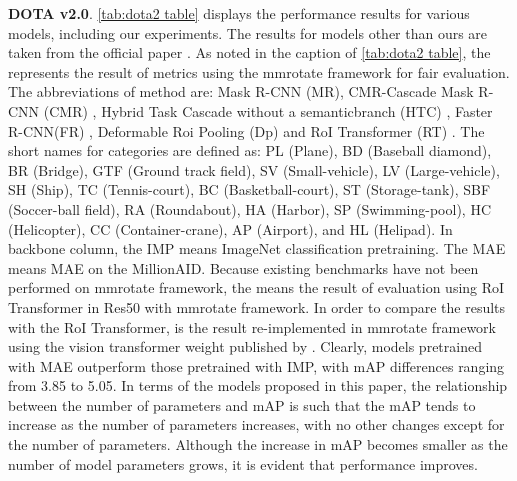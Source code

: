 \textbf{DOTA v2.0}. \autoref{tab:dota2 table} displays the performance results for various models, including our experiments. The results for models other than ours are taken from the official paper \cite{ding2021object}. As noted in the caption of \autoref{tab:dota2 table}, the  represents the result of metrics using the mmrotate framework for fair evaluation. {The abbreviations of method are: Mask R-CNN (MR)\cite{he2017mask}, CMR-Cascade Mask R-CNN (CMR) \cite{chen2019hybrid}, Hybrid Task Cascade without a semanticbranch (HTC) \cite{chen2019hybrid}, Faster R-CNN(FR) \cite{xia2018dota}, Deformable Roi Pooling (Dp) \cite{dai2017deformable} and RoI Transformer (RT) \cite{ding2019learning}. The short names for categories are defined as: PL (Plane), BD (Baseball diamond), BR (Bridge), GTF (Ground track field), SV (Small-vehicle), LV (Large-vehicle), SH (Ship), TC (Tennis-court), BC (Basketball-court), ST (Storage-tank), SBF (Soccer-ball field), RA (Roundabout), HA (Harbor), SP (Swimming-pool), HC (Helicopter), CC (Container-crane), AP (Airport), and HL (Helipad). In backbone column, the IMP means ImageNet classification pretraining. The MAE means MAE on the MillionAID.  Because existing benchmarks have not been performed on mmrotate framework, the  means the result of evaluation using RoI Transformer in Res50 with mmrotate framework. In order to compare the results with the RoI Transformer,  is the result re-implemented in mmrotate framework using the vision transformer weight published by \cite{wang2022advancing}.} Clearly, models pretrained with MAE outperform those pretrained with IMP, with mAP differences ranging from 3.85 to 5.05. In terms of the models proposed in this paper, the relationship between the number of parameters and mAP is such that the mAP tends to increase as the number of parameters increases, with no other changes except for the number of parameters. Although the increase in mAP becomes smaller as the number of model parameters grows, it is evident that performance improves.

